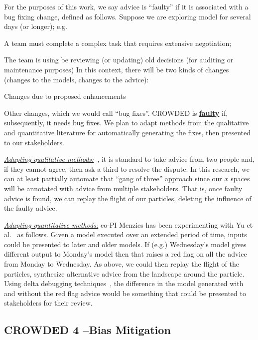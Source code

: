 For the purposes of this work, we say
advice is ``faulty'' if it is associated with a bug fixing change, defined as follows.
Suppose we are   exploring
model   for   several days (or longer); e.g.
\bi
\item A team must complete a complex task that requires extensive negotiation;
\item The team is using be reviewing (or updating) old decisions (for auditing or maintenance purposes)
\ei
In this context, there will be two kinds of changes (changes to the models, changes to the advice):
\bi
\item
Changes due to proposed enhancements 
\item
Other changes,  which we would call ``bug fixes''.
CROWDED is 
\underline{\bf faulty} if,      subsequently, it needs   bug fixes.
\ei
We plan to adapt methods from the qualitative and quantitative
literature for automatically generating the fixes, then presented to our stakeholders.

\underline{\em Adapting qualitative methods:}~\cite{Easterbrook08},
it is standard to   take advice from two people 
and, if they cannot agree, then ask a third to resolve the dispute. In this research, we can at least partially automate that ``gang of three'' approach since our $x$ spaces will be annotated with advice from multiple stakeholders.  That is, once faulty advice is found, we can replay the flight of our particles, deleting the influence of the faulty advice.
 


\underline{\em Adapting quantitative methods:}
co-PI Menzies
has been experimenting with Yu et al.~\cite{yu2019improving}  as follows.  Given a model  executed over an extended period of time,   inputs could be presented to later and older models.
If (e.g.) Wednesday's model
gives different output to Monday's model then that raises a red flag on all the advice from Monday to
Wednesday. As above, we could then replay the flight of the particles, synthesize alternative advice from the landscape around the particle. 
Using delta debugging techniques~\cite{Zeller99}, the difference in the model generated with and without the red flag advice would be something that could be presented to stakeholders for their review. 


 
 
 \subsection{CROWDED 4 --Bias Mitigation}
 

